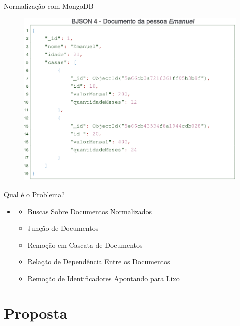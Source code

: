 \documentclass{beamer} %
\begin{document}
\begin{frame}{Normalização com MongoDB}
    \begin{figure}
        \centering
        \includegraphics[width=0.8\linewidth]{imagens/pessoa-emanuel.png}
        \label{fig:pessoa-emanuel}
    \end{figure}
\end{frame}

\begin{frame}{Qual é o Problema?}
    \begin{itemize}
        \item {}
        
        \begin{itemize}
            \item Buscas Sobre Documentos Normalizados
            \item Junção de Documentos
            \item Remoção em Cascata de Documentos
            \item Relação de Dependência Entre os Documentos
            \item Remoção de Identificadores Apontando para Lixo
        \end{itemize}
    \end{itemize}
\end{frame}

\section{Proposta}
\end{document}
